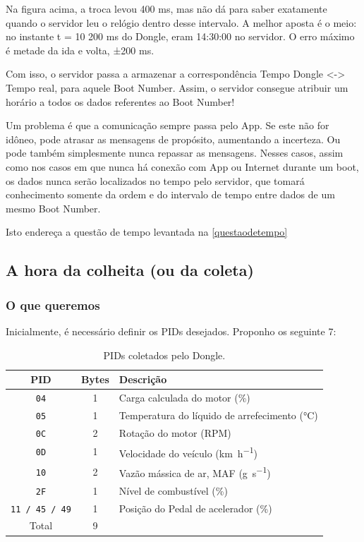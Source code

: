 \documentclass[12pt]{article}
\begin{document}
Na figura acima, a troca levou 400 ms, mas não dá para saber exatamente quando o servidor leu o relógio dentro desse intervalo. A melhor aposta é o meio: no instante t = 10 200 ms do Dongle, eram 14:30:00 no servidor. O erro máximo é metade da ida e volta, ±200 ms.

Com isso, o servidor passa a armazenar a correspondência Tempo Dongle <-> Tempo real, para aquele Boot Number. Assim, o servidor consegue atribuir um horário a todos os dados referentes ao Boot Number!

Um problema é que a comunicação sempre passa pelo App. Se este não for idôneo, pode atrasar as mensagens de propósito, aumentando a incerteza. Ou pode também simplesmente nunca repassar as mensagens. Nesses casos, assim como nos casos em que nunca há conexão com App ou Internet durante um boot, os dados nunca serão localizados no tempo pelo servidor, que tomará conhecimento somente da ordem e do intervalo de tempo entre dados de um mesmo Boot Number.

Isto endereça a questão de tempo levantada na \autoref{questaodetempo}

\subsection{A hora da colheita (ou da coleta)}
\subsubsection{O que queremos} \label{oquequeremos}
Inicialmente, é necessário definir os PIDs desejados. Proponho os seguinte 7:

\begin{table}[htbp]
  \centering
  \caption{PIDs coletados pelo Dongle.}
  \label{tab:pids}
  \begin{tabular}{ccl}
    \toprule
    PID & Bytes & Descrição \\
    \midrule
    \texttt{04} & 1 & Carga calculada do motor (\%) \\
    \texttt{05} & 1 & Temperatura do líquido de arrefecimento (\si{\celsius}) \\
    \texttt{0C} & 2 & Rotação do motor (RPM) \\
    \texttt{0D} & 1 & Velocidade do veículo (\si{\kilo\metre\per\hour}) \\
    \texttt{10} & 2 & Vazão mássica de ar, MAF (\si{\gram\per\second}) \\
    \texttt{2F} & 1 & Nível de combustível (\%) \\
    \texttt{11 / 45 / 49} & 1 & Posição do Pedal de acelerador (\%) \\
    \midrule
    Total & 9 & \\
    \bottomrule
  \end{tabular}
\end{table}
\end{document}
